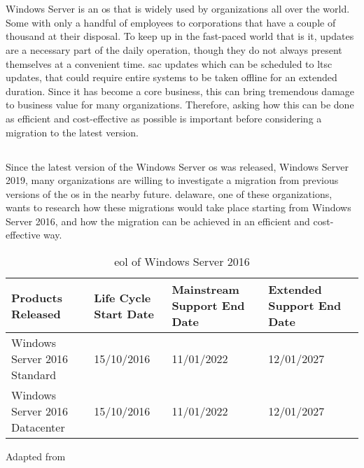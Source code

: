 \chapter{}
\label{ch:inleiding}
Windows Server is an \acrfull{os} that is widely used by organizations all over the world. 
Some with only a handful of employees to corporations that have a couple of thousand at their disposal. 
To keep up in the fast-paced world that is \acrfull{it}, updates are a necessary part of the daily operation, though they do not always present themselves at a convenient time. 
\acrfull{sac} updates which can be scheduled to \acrfull{ltsc} updates, that could require entire systems to be taken offline for an extended duration. 
Since \acrshort{it} has become a core business, this can bring tremendous damage to business value for many organizations.
Therefore, asking how this can be done as efficient and cost-effective as possible is important before considering a migration to the latest version. 

\section{}
\label{sec:probleemstelling}
Since the latest version of the Windows Server \acrshort{os} was released, Windows Server 2019, many organizations are willing to investigate a migration from previous versions of the \acrshort{os} in the nearby future. 
delaware, one of these organizations, wants to research how these migrations would take place starting from Windows Server 2016, and how the migration can be achieved in an efficient and cost-effective way. 

\begin{table}[htb!]
	\centering
	\begin{adjustbox}{width=1\textwidth}
		\begin{tabular}{l|l|l|ll}
			Products Released & Life Cycle Start Date & Mainstream Support End Date & Extended Support End Date &\\
			\hline
			Windows Server 2016 Standard & 15/10/2016 & 11/01/2022 & 12/01/2027 &\\
			Windows Server 2016 Datacenter & 15/10/2016 & 11/01/2022 & 12/01/2027 &\\
		\end{tabular}
	\end{adjustbox}
	\caption[\acrshort{eol} \acrshort{ws}2016]{\acrshort{eol} of Windows Server 2016}
	\scriptsize	
	Adapted from \cite{MicrosoftEOL2019}
	\label{tab:EOL2016}
\end{table}

